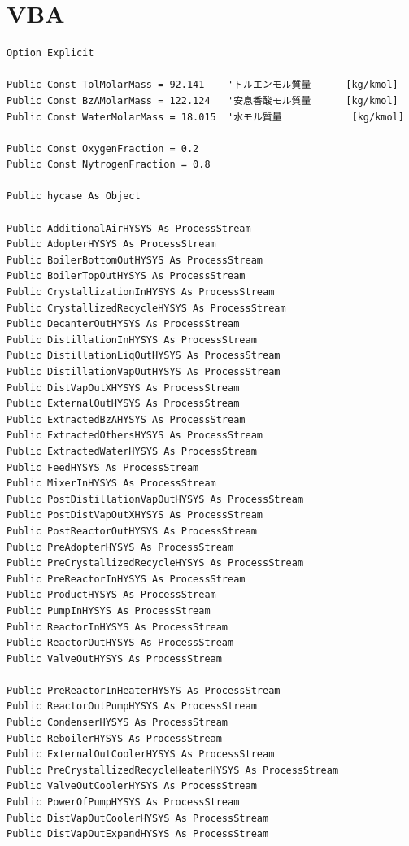 \documentclass[a4j]{jsreport}
\begin{document}
\section{VBA}
\begin{lstlisting}[caption=変数宣言]
Option Explicit

Public Const TolMolarMass = 92.141    'トルエンモル質量      [kg/kmol]
Public Const BzAMolarMass = 122.124   '安息香酸モル質量      [kg/kmol]
Public Const WaterMolarMass = 18.015  '水モル質量            [kg/kmol]

Public Const OxygenFraction = 0.2
Public Const NytrogenFraction = 0.8

Public hycase As Object

Public AdditionalAirHYSYS As ProcessStream
Public AdopterHYSYS As ProcessStream
Public BoilerBottomOutHYSYS As ProcessStream
Public BoilerTopOutHYSYS As ProcessStream
Public CrystallizationInHYSYS As ProcessStream
Public CrystallizedRecycleHYSYS As ProcessStream
Public DecanterOutHYSYS As ProcessStream
Public DistillationInHYSYS As ProcessStream
Public DistillationLiqOutHYSYS As ProcessStream
Public DistillationVapOutHYSYS As ProcessStream
Public DistVapOutXHYSYS As ProcessStream
Public ExternalOutHYSYS As ProcessStream
Public ExtractedBzAHYSYS As ProcessStream
Public ExtractedOthersHYSYS As ProcessStream
Public ExtractedWaterHYSYS As ProcessStream
Public FeedHYSYS As ProcessStream
Public MixerInHYSYS As ProcessStream
Public PostDistillationVapOutHYSYS As ProcessStream
Public PostDistVapOutXHYSYS As ProcessStream
Public PostReactorOutHYSYS As ProcessStream
Public PreAdopterHYSYS As ProcessStream
Public PreCrystallizedRecycleHYSYS As ProcessStream
Public PreReactorInHYSYS As ProcessStream
Public ProductHYSYS As ProcessStream
Public PumpInHYSYS As ProcessStream
Public ReactorInHYSYS As ProcessStream
Public ReactorOutHYSYS As ProcessStream
Public ValveOutHYSYS As ProcessStream

Public PreReactorInHeaterHYSYS As ProcessStream
Public ReactorOutPumpHYSYS As ProcessStream
Public CondenserHYSYS As ProcessStream
Public ReboilerHYSYS As ProcessStream
Public ExternalOutCoolerHYSYS As ProcessStream
Public PreCrystallizedRecycleHeaterHYSYS As ProcessStream
Public ValveOutCoolerHYSYS As ProcessStream
Public PowerOfPumpHYSYS As ProcessStream
Public DistVapOutCoolerHYSYS As ProcessStream
Public DistVapOutExpandHYSYS As ProcessStream
\end{lstlisting}
\end{document}
